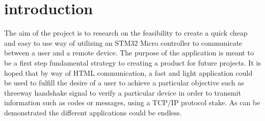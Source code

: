 \section{introduction}
The aim of the project is to research on the feasibility to create a quick cheap
 and easy to use way of utilizing an STM32 Micro controller to communicate
 between a user and a remote device. The purpose of the application is meant
 to be a first step fundamental strategy to creating a product for future
 projects. It is hoped that by way of HTML communication, a fast and light
 application could be used to fulfill the desire of a user to achieve a
 particular objective such as threeway handshake signal to verify a particular
 device in order to transmit information such as codes or messages, using a
 TCP/IP protocol stake. As can be demonstrated the different applications could
 be endless.
